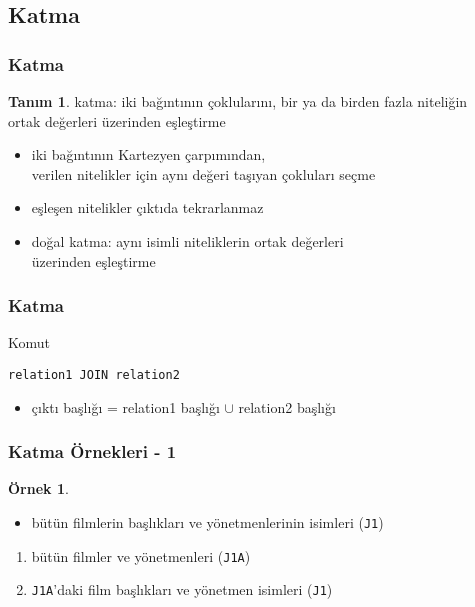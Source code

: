 \documentclass[dvipsnames]{beamer}
\theoremstyle{definition}
\newtheorem{tanim}[theorem]{Tanım}
\theoremstyle{example}
\newtheorem{ornek}[theorem]{Örnek}
\theoremstyle{plain}
\begin{document}
\subsection{Katma}

\begin{frame}[fragile]
  \frametitle{Katma}

  \begin{tanim}
    \alert{katma}: iki bağıntının çoklularını, bir ya da birden fazla niteliğin\\
      ortak değerleri üzerinden eşleştirme
  \end{tanim}

  \begin{itemize}
    \item iki bağıntının Kartezyen çarpımından,\\
      verilen nitelikler için aynı değeri taşıyan çokluları seçme
    \item eşleşen nitelikler çıktıda tekrarlanmaz

    \pause
    \item \alert{doğal katma}: aynı isimli niteliklerin ortak değerleri\\
      üzerinden eşleştirme
  \end{itemize}
\end{frame}

\begin{frame}[fragile]
  \frametitle{Katma}

  \begin{block}{Komut}
    \begin{lstlisting}
relation1 JOIN relation2
    \end{lstlisting}
  \end{block}

  \pause
  \begin{itemize}
    \item çıktı başlığı = relation1 başlığı $\cup$ relation2 başlığı
  \end{itemize}
\end{frame}

\begin{frame}
  \frametitle{Katma Örnekleri - 1}

  \begin{ornek}
    \begin{itemize}
      \item bütün filmlerin başlıkları ve yönetmenlerinin isimleri (\texttt{J1})
    \end{itemize}

    \pause
    \begin{enumerate}
      \item bütün filmler ve yönetmenleri (\texttt{J1A})

      \pause
      \item \texttt{J1A}'daki film başlıkları ve yönetmen isimleri
         (\texttt{J1})
    \end{enumerate}
  \end{ornek}
\end{frame}
\end{document}
